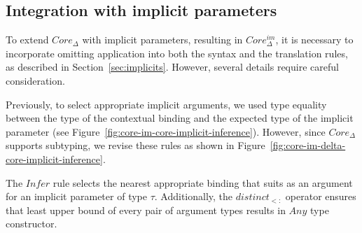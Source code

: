 \documentclass[acmsmall,review,screen]{acmart}
\begin{document}





\subsection{Integration with implicit parameters}

To extend $Core_\Delta$ with implicit parameters, resulting in $Core_\Delta^{im}$, it is necessary to incorporate omitting application into both the syntax and the translation rules, as described in Section~\ref{sec:implicits}.
However, several details require careful consideration.

Previously, to select appropriate implicit arguments, we used type equality between the type of the contextual binding and the expected type of the implicit parameter (see Figure\ \ref{fig:core-im-core-implicit-inference}).
However, since $Core_\Delta$ supports subtyping, we revise these rules as shown in Figure~\ref{fig:core-im-delta-core-implicit-inference}.

The $Infer$ rule selects the nearest appropriate binding that suits as an argument for an implicit parameter of type $\tau$.
Additionally, the $distinct_{<:}$ operator ensures that least upper bound of every pair of argument types results in $Any$ type constructor.
\end{document}
